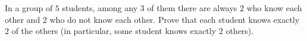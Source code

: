 In a group of $5$ students, among any $3$ of them there are always $2$ who know each other and $2$ who do not know each other. Prove that each student knows exactly $2$ of the others (in particular, some student knows exactly $2$ others).
